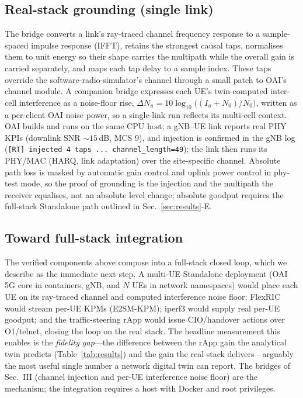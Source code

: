 \documentclass[conference]{IEEEtran}
\begin{document}
\subsection{Real-stack grounding (single link)}
The bridge converts a link's ray-traced channel frequency response to a
sample-spaced impulse response (IFFT), retains the strongest causal taps,
normalises them to unit energy so their shape carries the multipath while the
overall gain is carried separately, and maps each tap delay to a sample index.
These taps override the software-radio-simulator's channel through a small patch to
OAI's channel module. A companion bridge expresses each UE's twin-computed
inter-cell interference as a noise-floor rise,
$\Delta N_u=10\log_{10}\!\big((I_u+N_0)/N_0\big)$, written as a per-client OAI noise
power, so a single-link run reflects its multi-cell context. OAI builds and runs on
the same CPU host; a gNB--UE link reports real PHY KPIs (downlink SNR
${\sim}15$\,dB, MCS 9), and injection is confirmed in the gNB log
(\texttt{[RT] injected 4 taps ... channel\_length=49}); the link then runs its
PHY/MAC (HARQ, link adaptation) over the site-specific channel. Absolute path loss
is masked by automatic gain control and uplink power control in phy-test mode, so
the proof of grounding is the injection and the multipath the receiver equalises,
not an absolute level change; absolute goodput requires the full-stack Standalone
path outlined in Sec.~\ref{sec:results}-E.

\subsection{Toward full-stack integration}
The verified components above compose into a full-stack closed loop, which we
describe as the immediate next step. A multi-UE Standalone deployment (OAI 5G core
in containers, gNB, and $N$ UEs in network namespaces) would place each UE on its
ray-traced channel and computed interference noise floor; FlexRIC would stream
per-UE KPMs (E2SM-KPM); iperf3 would supply real per-UE goodput; and the
traffic-steering rApp would issue CIO/handover actions over O1/telnet, closing the
loop on the real stack. The headline measurement this enables is the
\emph{fidelity gap}---the difference between the rApp gain the analytical twin
predicts (Table~\ref{tab:results}) and the gain the real stack delivers---arguably
the most useful single number a network digital twin can report. The bridges of
Sec.~III (channel injection and per-UE interference noise floor) are the mechanism;
the integration requires a host with Docker and root privileges.
\end{document}
